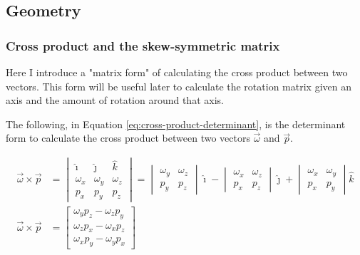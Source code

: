 \documentclass[12pt]{article}
\begin{document}
\subsection{Geometry}
\subsubsection{Cross product and the skew-symmetric matrix}
Here I introduce a "matrix form" of calculating the cross product between two vectors. This form will be useful later to calculate the rotation matrix given an axis and the amount of rotation around that axis.

The following, in Equation \ref{eq:cross-product-determinant}, is the determinant form to calculate the cross product between two vectors $\vec{\omega}$ and $\vec{p}$.

\begin{equation}\begin{aligned}
    \vec{\omega} \times \vec{p} &= 
        \begin{vmatrix} 
            \hat{\imath} & \hat{\jmath} & \hat{k} \\
            \omega_x & \omega_y & \omega_z \\
            p_x & p_y & p_z 
        \end{vmatrix} =
        \begin{vmatrix}
            \omega_y & \omega_z \\
            p_y & p_z
        \end{vmatrix} \hat{\imath} -
        \begin{vmatrix}
            \omega_x & \omega_z \\
            p_x & p_z 
        \end{vmatrix} \hat{\jmath} +
        \begin{vmatrix}
            \omega_x & \omega_y \\
            p_x & p_y
        \end{vmatrix} \hat{k} \\
    \vec{\omega} \times \vec{p} &= 
        \begin{bmatrix}
            \omega_y p_z - \omega_z p_y \\
            \omega_z p_x - \omega_x p_z \\
            \omega_x p_y - \omega_y p_x
        \end{bmatrix}
\end{aligned}
\label{eq:cross-product-determinant}
\end{equation}
\end{document}
